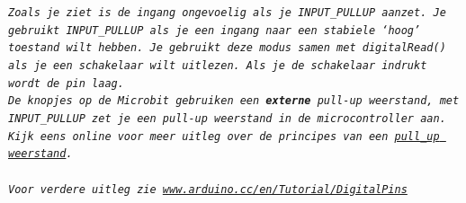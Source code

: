 \begin{minipage}{\linewidth}
	\footnotesize{\texttt{\textit{Zoals je ziet is de ingang ongevoelig als je \textcolor{arduinoBlue}{INPUT\_PULLUP} aanzet. Je gebruikt \textcolor{arduinoBlue}{INPUT\_PULLUP} als je een ingang naar een stabiele ‘hoog’ toestand wilt hebben. Je gebruikt deze modus samen met digitalRead() als je een schakelaar wilt uitlezen. Als je de schakelaar indrukt wordt de pin laag.\\
				De knopjes op de Microbit gebruiken een \textbf{externe} pull-up weerstand, met \textcolor{arduinoBlue}{INPUT\_PULLUP} zet je een pull-up weerstand in de microcontroller aan.\\ Kijk eens online voor meer uitleg over de principes van een  \href{https://www.freecodecamp.org/news/a-simple-explanation-of-pull-down-and-pull-up-resistors-660b308f116a/}{pull\_up weerstand}.\\ \\
				Voor verdere uitleg zie \href{https://www.arduino.cc/en/Tutorial/DigitalPins}{www.arduino.cc/en/Tutorial/DigitalPins}
	}}}
\end{minipage}
\normalsize
